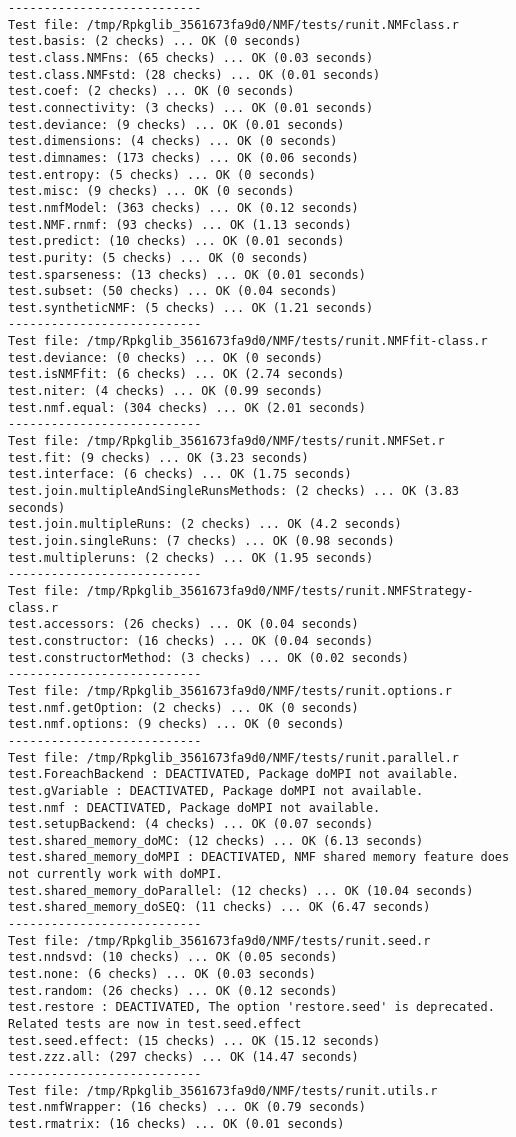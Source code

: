 \documentclass[10pt]{article}\usepackage[]{graphicx}\usepackage[]{color}
\begin{document}
\begin{verbatim}
--------------------------- 
Test file: /tmp/Rpkglib_3561673fa9d0/NMF/tests/runit.NMFclass.r 
test.basis: (2 checks) ... OK (0 seconds)
test.class.NMFns: (65 checks) ... OK (0.03 seconds)
test.class.NMFstd: (28 checks) ... OK (0.01 seconds)
test.coef: (2 checks) ... OK (0 seconds)
test.connectivity: (3 checks) ... OK (0.01 seconds)
test.deviance: (9 checks) ... OK (0.01 seconds)
test.dimensions: (4 checks) ... OK (0 seconds)
test.dimnames: (173 checks) ... OK (0.06 seconds)
test.entropy: (5 checks) ... OK (0 seconds)
test.misc: (9 checks) ... OK (0 seconds)
test.nmfModel: (363 checks) ... OK (0.12 seconds)
test.NMF.rnmf: (93 checks) ... OK (1.13 seconds)
test.predict: (10 checks) ... OK (0.01 seconds)
test.purity: (5 checks) ... OK (0 seconds)
test.sparseness: (13 checks) ... OK (0.01 seconds)
test.subset: (50 checks) ... OK (0.04 seconds)
test.syntheticNMF: (5 checks) ... OK (1.21 seconds)
--------------------------- 
Test file: /tmp/Rpkglib_3561673fa9d0/NMF/tests/runit.NMFfit-class.r 
test.deviance: (0 checks) ... OK (0 seconds)
test.isNMFfit: (6 checks) ... OK (2.74 seconds)
test.niter: (4 checks) ... OK (0.99 seconds)
test.nmf.equal: (304 checks) ... OK (2.01 seconds)
--------------------------- 
Test file: /tmp/Rpkglib_3561673fa9d0/NMF/tests/runit.NMFSet.r 
test.fit: (9 checks) ... OK (3.23 seconds)
test.interface: (6 checks) ... OK (1.75 seconds)
test.join.multipleAndSingleRunsMethods: (2 checks) ... OK (3.83 seconds)
test.join.multipleRuns: (2 checks) ... OK (4.2 seconds)
test.join.singleRuns: (7 checks) ... OK (0.98 seconds)
test.multipleruns: (2 checks) ... OK (1.95 seconds)
--------------------------- 
Test file: /tmp/Rpkglib_3561673fa9d0/NMF/tests/runit.NMFStrategy-class.r 
test.accessors: (26 checks) ... OK (0.04 seconds)
test.constructor: (16 checks) ... OK (0.04 seconds)
test.constructorMethod: (3 checks) ... OK (0.02 seconds)
--------------------------- 
Test file: /tmp/Rpkglib_3561673fa9d0/NMF/tests/runit.options.r 
test.nmf.getOption: (2 checks) ... OK (0 seconds)
test.nmf.options: (9 checks) ... OK (0 seconds)
--------------------------- 
Test file: /tmp/Rpkglib_3561673fa9d0/NMF/tests/runit.parallel.r 
test.ForeachBackend : DEACTIVATED, Package doMPI not available.
test.gVariable : DEACTIVATED, Package doMPI not available.
test.nmf : DEACTIVATED, Package doMPI not available.
test.setupBackend: (4 checks) ... OK (0.07 seconds)
test.shared_memory_doMC: (12 checks) ... OK (6.13 seconds)
test.shared_memory_doMPI : DEACTIVATED, NMF shared memory feature does not currently work with doMPI.
test.shared_memory_doParallel: (12 checks) ... OK (10.04 seconds)
test.shared_memory_doSEQ: (11 checks) ... OK (6.47 seconds)
--------------------------- 
Test file: /tmp/Rpkglib_3561673fa9d0/NMF/tests/runit.seed.r 
test.nndsvd: (10 checks) ... OK (0.05 seconds)
test.none: (6 checks) ... OK (0.03 seconds)
test.random: (26 checks) ... OK (0.12 seconds)
test.restore : DEACTIVATED, The option 'restore.seed' is deprecated. Related tests are now in test.seed.effect
test.seed.effect: (15 checks) ... OK (15.12 seconds)
test.zzz.all: (297 checks) ... OK (14.47 seconds)
--------------------------- 
Test file: /tmp/Rpkglib_3561673fa9d0/NMF/tests/runit.utils.r 
test.nmfWrapper: (16 checks) ... OK (0.79 seconds)
test.rmatrix: (16 checks) ... OK (0.01 seconds)


\end{verbatim}
\end{document}
